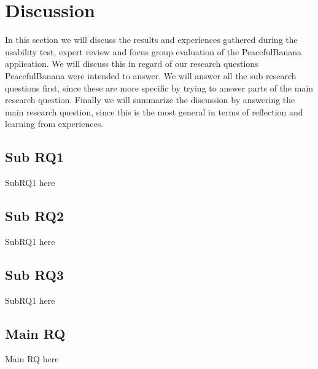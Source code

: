 \section{Discussion}
In this section we will discuss the results and experiences gathered during the usability test, expert review and focus group evaluation of the PeacefulBanana application. We will discuss this in regard of our research questions PeacefulBanana were intended to answer. We will answer all the sub research questions first, since these are more specific by trying to answer parts of the main research question. Finally we will summarize the discussion by answering the main research question, since this is the most general in terms of reflection and learning from experiences. 

\subsection{Sub RQ1}
SubRQ1 here

\subsection{Sub RQ2}
SubRQ1 here

\subsection{Sub RQ3}
SubRQ1 here

\subsection{Main RQ}
Main RQ here
